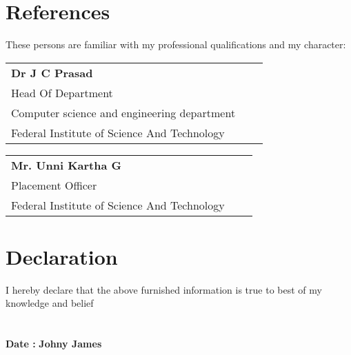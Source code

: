 \documentclass[a4paper]{article}
\begin{document}
\section{References}
\noindent These persons are familiar with my professional qualifications and my character:
\begin{table}[h]
\begin{tabular}{@{}lll@{}}
\textbf{Dr J C Prasad} \\
Head Of Department\\
Computer science and engineering department\\
Federal Institute of Science And Technology
\end{tabular}
\end{table}

\begin{table}[h]
\begin{tabular}{@{}lll@{}}
\textbf{Mr. Unni Kartha G} \\
Placement Officer\\
Federal Institute of Science And Technology
\end{tabular}
\end{table}

\section{Declaration}
I hereby declare that the above furnished information is true to best of my knowledge and belief \\ \\ \\
\vspace{5\baselineskip}
\textbf {Date :} \hfill \textbf{Johny James}
\end{document}
